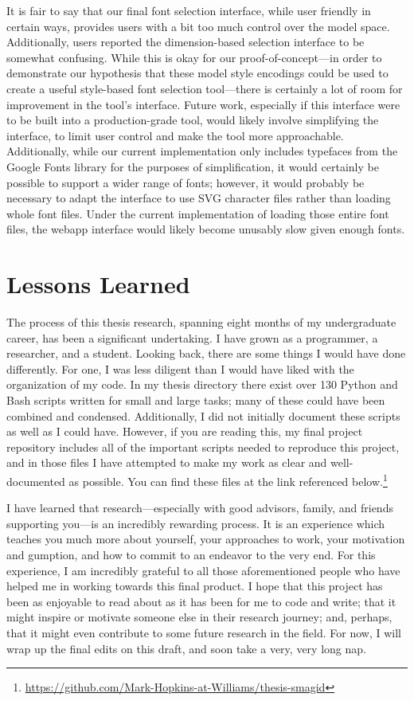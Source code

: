 It is fair to say that our final font selection interface, while user friendly in certain ways, provides users with a bit too much control over the model space. Additionally, users reported the dimension-based selection interface to be somewhat confusing. While this is okay for our proof-of-concept---in order to demonstrate our hypothesis that these model style encodings could be used to create a useful style-based font selection tool---there is certainly a lot of room for improvement in the tool's interface. Future work, especially if this interface were to be built into a production-grade tool, would likely involve simplifying the interface, to limit user control and make the tool more approachable. Additionally, while our current implementation only includes typefaces from the Google Fonts library for the purposes of simplification, it would certainly be possible to support a wider range of fonts; however, it would probably be necessary to adapt the interface to use SVG character files rather than loading whole font files. Under the current implementation of loading those entire font files, the webapp interface would likely become unusably slow given enough fonts.

\section{Lessons Learned}

The process of this thesis research, spanning eight months of my undergraduate career, has been a significant undertaking. I have grown as a programmer, a researcher, and a student. Looking back, there are some things I would have done differently. For one, I was less diligent than I would have liked with the organization of my code. In my thesis directory there exist over 130 Python and Bash scripts written for small and large tasks; many of these could have been combined and condensed. Additionally, I did not initially document these scripts as well as I could have. However, if you are reading this, my final project repository includes all of the important scripts needed to reproduce this project, and in those files I have attempted to make my work as clear and well-documented as possible. You can find these files at the link referenced below.\footnote{\url{https://github.com/Mark-Hopkins-at-Williams/thesis-smagid}}

I have learned that research---especially with good advisors, family, and friends supporting you---is an incredibly rewarding process. It is an experience which teaches you much more about yourself, your approaches to work, your motivation and gumption, and how to commit to an endeavor to the very end. For this experience, I am incredibly grateful to all those aforementioned people who have helped me in working towards this final product. I hope that this project has been as enjoyable to read about as it has been for me to code and write; that it might inspire or motivate someone else in their research journey; and, perhaps, that it might even contribute to some future research in the field. For now, I will wrap up the final edits on this draft, and soon take a very, very long nap.